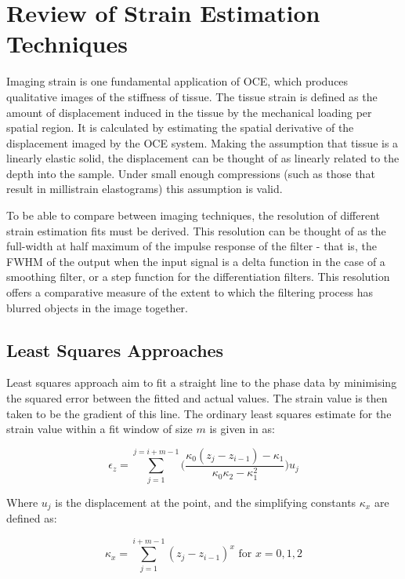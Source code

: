 \chapter{Review of Strain Estimation Techniques}

Imaging strain is one fundamental application of OCE, which produces qualitative images of the stiffness of tissue. The tissue strain is defined as the amount of displacement induced in the tissue by the mechanical loading per spatial region. It is calculated by estimating the spatial derivative of the displacement imaged by the OCE system. Making the assumption that tissue is a linearly elastic solid, the displacement can be thought of as linearly related to the depth into the sample. Under small enough compressions (such as those that result in millistrain elastograms) this assumption is valid. 

To be able to compare between imaging techniques, the resolution of different strain estimation fits must be derived. This resolution can be thought of as the full-width at half maximum of the impulse response of the filter - that is, the FWHM of the output when the input signal is a delta function in the case of a smoothing filter, or a step function for the differentiation filters. This resolution offers a comparative measure of the extent to which the filtering process has blurred objects in the image together. 

\section{Least Squares Approaches}
Least squares approach aim to fit a straight line to the phase data by minimising the squared error between the fitted and actual values. The strain value is then taken to be the gradient of this line. The ordinary least squares estimate for the strain value within a fit window of size $m$ is given in \cite{kennedy_strain_2012} as:

\begin{equation}
	\label{ols_strain}
	\epsilon_z = \sum\limits_{j=1}^{j=i+m-1} \bigg(\frac{\kappa_0 (z_j-z_{i-1})-\kappa_1}{\kappa_0 \kappa_2 - \kappa_1^2} \bigg) u_j
\end{equation}

Where $u_j$ is the displacement at the point, and the simplifying constants $\kappa_x$ are defined as:

\begin{equation}
	\label{ols_k}
	\kappa_x = \sum \limits_{j=1}^{i+m-1} (z_j - z_{i-1})^x \text{   for   } x = 0,1,2
\end{equation}

